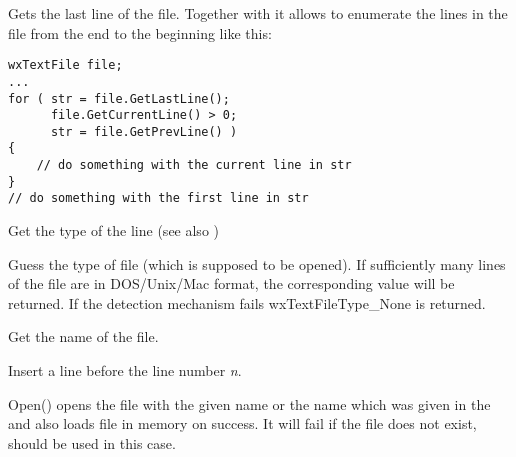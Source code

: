 
Gets the last line of the file. Together with 
 it allows to enumerate the lines
in the file from the end to the beginning like this:

\begin{verbatim}
wxTextFile file;
...
for ( str = file.GetLastLine();
      file.GetCurrentLine() > 0;
      str = file.GetPrevLine() )
{
    // do something with the current line in str
}
// do something with the first line in str
\end{verbatim}

\label{wxtextfilegetlinetype}


Get the type of the line (see also )

\label{wxtextfileguesstype}


Guess the type of file (which is supposed to be opened). If sufficiently
many lines of the file are in DOS/Unix/Mac format, the corresponding value will
be returned. If the detection mechanism fails wxTextFileType\_None is returned.

\label{wxtextfilegetname}


Get the name of the file.

\label{wxtextfileinsertline}


Insert a line before the line number {\it n}.

\label{wxtextfileopen}



Open() opens the file with the given name or the name which was given in the
 and also loads file in memory on
success. It will fail if the file does not exist, 
 should be used in this case.

